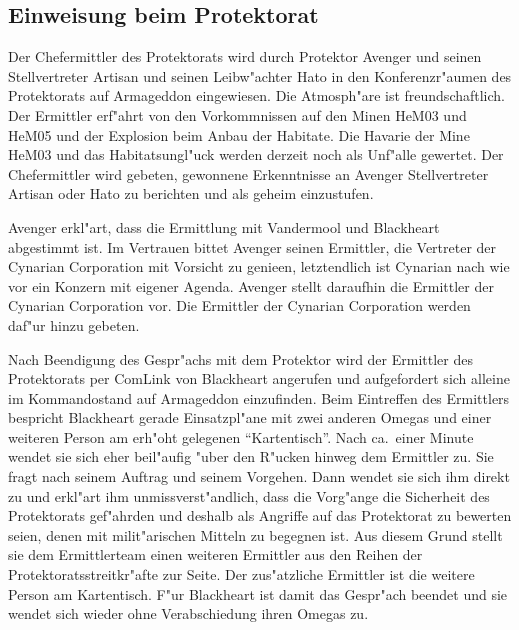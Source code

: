 \subsection{Einweisung beim Protektorat}

Der Chefermittler des Protektorats wird durch Protektor Avenger und seinen Stellvertreter Artisan und seinen Leibw"achter Hato in den Konferenzr"aumen des Protektorats auf Armageddon eingewiesen. Die Atmosph"are ist freundschaftlich. Der Ermittler erf"ahrt von den Vorkommnissen auf den Minen HeM03 und HeM05 und der Explosion beim Anbau der Habitate. Die Havarie der Mine HeM03 und das Habitatsungl"uck werden derzeit noch als Unf"alle gewertet. Der Chefermittler wird gebeten, gewonnene Erkenntnisse an Avenger Stellvertreter Artisan oder Hato zu berichten und als geheim einzustufen.

Avenger erkl"art, dass die Ermittlung mit Vandermool und Blackheart abgestimmt ist. Im Vertrauen bittet Avenger seinen Ermittler, die Vertreter der Cynarian Corporation mit Vorsicht zu genie\3en, letztendlich ist Cynarian nach wie vor ein Konzern mit eigener Agenda. Avenger stellt daraufhin die Ermittler der Cynarian Corporation vor. Die Ermittler der Cynarian Corporation werden daf"ur hinzu gebeten.

Nach Beendigung des Gespr"achs mit dem Protektor wird der Ermittler des Protektorats per ComLink von Blackheart angerufen und aufgefordert sich alleine im Kommandostand auf Armageddon einzufinden. Beim Eintreffen des Ermittlers bespricht Blackheart gerade Einsatzpl"ane mit zwei anderen Omegas und einer weiteren Person am erh"oht gelegenen "`Kartentisch"'. Nach ca.~einer Minute  wendet sie sich eher beil"aufig "uber den R"ucken hinweg dem Ermittler zu. Sie fragt nach seinem Auftrag und seinem Vorgehen. Dann wendet sie sich ihm direkt zu und erkl"art ihm unmissverst"andlich, dass die Vorg"ange die Sicherheit des Protektorats gef"ahrden und deshalb als Angriffe auf das Protektorat zu bewerten seien, denen mit milit"arischen Mitteln zu begegnen ist. Aus diesem Grund stellt sie dem Ermittlerteam einen weiteren Ermittler aus den Reihen der Protektoratsstreitkr"afte zur Seite. Der zus"atzliche Ermittler ist die weitere Person am Kartentisch. F"ur Blackheart ist damit das Gespr"ach beendet und sie wendet sich wieder ohne Verabschiedung ihren Omegas zu.


